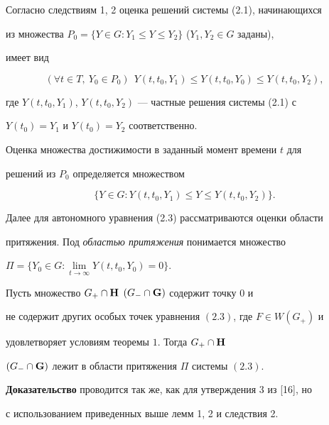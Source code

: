 Согласно следствиям 1, 2 оценка решений системы (2.1), начинающихся


из множества $P_0=\{Y\in G:Y_1\le Y\le Y_2\}$ ($Y_1,Y_2\in G$ заданы),


имеет вид


$$


(\forall t\in T,\ Y_0\in P_0)\ \ Y(t,t_0,Y_1)\le


Y(t,t_0,Y_0)\le Y(t,t_0,Y_2),


$$


где $Y(t,t_0,Y_1)$, $Y(t,t_0,Y_2)$ --- частные решения системы (2.1) с


$Y(t_0)=Y_1$ и $Y(t_0)=Y_2$ соответственно.





Оценка множества достижимости в заданный момент времени $t$ для


решений из $P_0$ определяется множеством


$$


\{Y\in G:Y(t,t_0,Y_1)\le Y\le Y(t,t_0,Y_2)\}.


$$





Далее для автономного уравнения (2.3) рассматриваются оценки области


притяжения. Под {\it областью притяжения} понимается множество


$\Pi=\{Y_0\in G:\lim\limits_{t\to\infty}Y(t,t_0,Y_0)=0\}$.





\begin{thm}


Пусть множество $G_+\cap\bold H$ $(G_-\cap\bold G)$ содержит точку $0$ и


не содержит других особых точек уравнения $(2.3)$, где $F\in W(G_+)$ и


удовлетворяет условиям теоремы $1$. Тогда $G_+\cap\bold H$


$(G_-\cap\bold G)$ лежит в области притяжения $\Pi$ системы $(2.3)$.


\end{thm}





{\bf Доказательство} проводится так же, как для утверждения 3 из [16], но


с использованием приведенных выше лемм 1, 2 и следствия 2.





